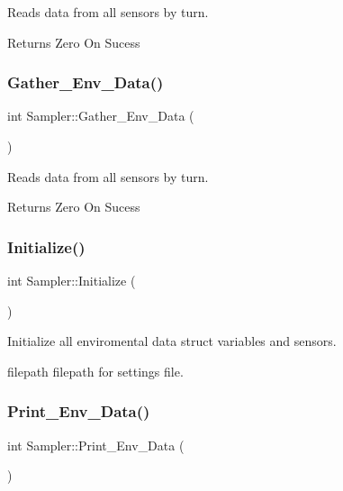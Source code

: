 Reads data from all sensors by turn.

\begin{DoxyReturn}{Returns}
Zero On Sucess 
\end{DoxyReturn}
\mbox{\label{classSampler_a5702d0ef89adb532fef4f9879e7e36d4}} 
\subsubsection{\texorpdfstring{Gather\+\_\+\+Env\+\_\+\+Data()}{Gather\_Env\_Data()}}
{\footnotesize\ttfamily int Sampler\+::\+Gather\+\_\+\+Env\+\_\+\+Data (\begin{DoxyParamCaption}{ }\end{DoxyParamCaption})\hspace{0.3cm}{\ttfamily [private]}}

Reads data from all sensors by turn.

\begin{DoxyReturn}{Returns}
Zero On Sucess 
\end{DoxyReturn}
\mbox{\label{classSampler_a1aed5b32bf99312ba38d092f1acad3d9}} 
\subsubsection{\texorpdfstring{Initialize()}{Initialize()}}
{\footnotesize\ttfamily int Sampler\+::\+Initialize (\begin{DoxyParamCaption}{ }\end{DoxyParamCaption})\hspace{0.3cm}{\ttfamily [private]}}

Initialize all enviromental data struct variables and sensors.

filepath filepath for settings file. \mbox{\label{classSampler_acf3d04a740356e54fe53766a7f00ae15}} 
\subsubsection{\texorpdfstring{Print\+\_\+\+Env\+\_\+\+Data()}{Print\_Env\_Data()}}
{\footnotesize\ttfamily int Sampler\+::\+Print\+\_\+\+Env\+\_\+\+Data (\begin{DoxyParamCaption}{ }\end{DoxyParamCaption})\hspace{0.3cm}{\ttfamily [private]}}

